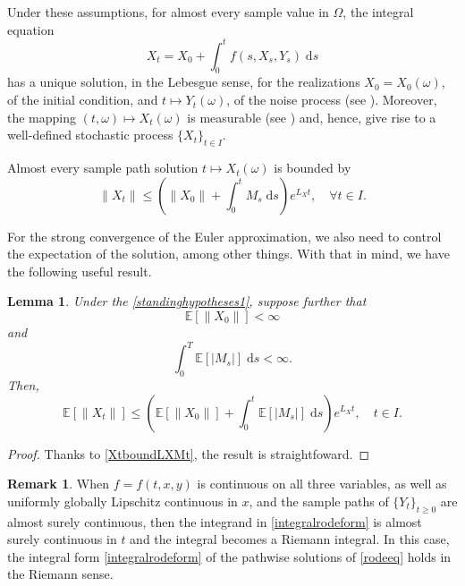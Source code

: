 \documentclass[reqno,12pt]{amsart}
\theoremstyle{plain} %
\newtheorem{lemma}{Lemma}[section]
\theoremstyle{definition} %
\newtheorem{remark}{Remark}[section]
\begin{document}
Under these assumptions, for almost every sample value in $\Omega$, the integral equation
\begin{equation}
    \label{integralrodeform}
    X_t = X_0 + \int_0^t f(s, X_s, Y_s) \;\mathrm{d}s
\end{equation}
has a unique solution, in the Lebesgue sense, for the realizations $X_0 = X_0(\omega)$, of the initial condition, and $t\mapsto Y_t(\omega)$, of the noise process (see \cite[Theorem 1.1]{CoddingtonLevinson1985}). Moreover, the mapping $(t, \omega) \mapsto X_t(\omega)$ is measurable (see \cite[Section 2.1.2]{HanKloeden2017}) and, hence, give rise to a well-defined stochastic process $\{X_t\}_{t\in I}$.

Almost every sample path solution $t \mapsto X_t(\omega)$ is bounded by
\begin{equation}
    \label{XtboundLXMt}
    \|X_t\| \leq \left(\|X_0\| + \int_0^t M_s\;\mathrm{d}s\right) e^{L_X t}, \quad \forall t\in I.
\end{equation}

For the strong convergence of the Euler approximation, we also need to control the expectation of the solution, among other things. With that in mind, we have the following useful result.
\begin{lemma}
    Under the \cref{standinghypotheses1}, suppose further that
    \begin{equation}
        \label{EX0strongbound}
        \mathbb{E}[\|X_0\|] < \infty
    \end{equation}
    and
    \begin{equation}
        \label{EMtstrongbound}
        \int_0^T \mathbb{E}[|M_s|] \;\mathrm{d}s < \infty.
    \end{equation}
    Then,
    \begin{equation}
        \label{EXtstrongbound}
        \mathbb{E}[\|X_t\|] \leq \left(\mathbb{E}[\|X_0\|] + \int_0^t \mathbb{E}[|M_s|]\;\mathrm{d}s\right) e^{L_X t}, \quad t\in I.
    \end{equation}
\end{lemma}

\begin{proof}
    Thanks to \eqref{XtboundLXMt}, the result is straightfoward.
\end{proof}

\begin{remark}
    When $f=f(t, x, y)$ is continuous on all three variables, as well as uniformly globally Lipschitz continuous in $x$, and the sample paths of $\{Y_t\}_{t\geq 0}$ are almost surely continuous, then the integrand in \eqref{integralrodeform} is almost surely continuous in $t$ and the integral becomes a Riemann integral. In this case, the integral form \eqref{integralrodeform} of the pathwise solutions of \eqref{rodeeq} holds in the Riemann sense.
\end{remark}
\end{document}

